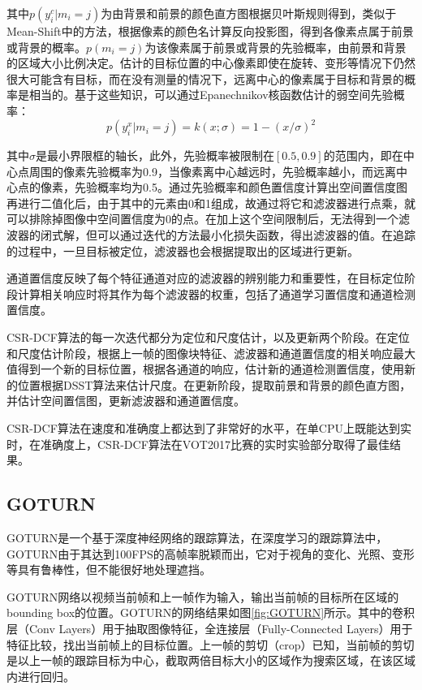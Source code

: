   其中$p(y_i^c | m_i=j)$为由背景和前景的颜色直方图根据贝叶斯规则得到，类似于Mean-Shift中的方法，根据像素的颜色名计算反向投影图，得到各像素点属于前景或背景的概率。$p(m_i=j)$为该像素属于前景或背景的先验概率，由前景和背景的区域大小比例决定。估计的目标位置的中心像素即使在旋转、变形等情况下仍然很大可能含有目标，而在没有测量的情况下，远离中心的像素属于目标和背景的概率是相当的。基于这些知识，可以通过Epanechnikov核函数估计的弱空间先验概率：
$$p(y_i^x | m_i=j) = k(x;\sigma)=1-(x/\sigma)^2$$

  其中$\sigma$是最小界限框的轴长，此外，先验概率被限制在$[0.5,0.9]$的范围内，即在中心点周围的像素先验概率为0.9，当像素离中心越远时，先验概率越小，而远离中心点的像素，先验概率均为0.5。通过先验概率和颜色置信度计算出空间置信度图再进行二值化后，由于其中的元素由0和1组成，故通过将它和滤波器进行点乘，就可以排除掉图像中空间置信度为0的点。在加上这个空间限制后，无法得到一个滤波器的闭式解，但可以通过迭代的方法最小化损失函数，得出滤波器的值。在追踪的过程中，一旦目标被定位，滤波器也会根据提取出的区域进行更新。

  通道置信度反映了每个特征通道对应的滤波器的辨别能力和重要性，在目标定位阶段计算相关响应时将其作为每个滤波器的权重，包括了通道学习置信度和通道检测置信度。

  CSR-DCF算法的每一次迭代都分为定位和尺度估计，以及更新两个阶段。在定位和尺度估计阶段，根据上一帧的图像块特征、滤波器和通道置信度的相关响应最大值得到一个新的目标位置，根据各通道的响应，估计新的通道检测置信度，使用新的位置根据DSST算法来估计尺度。在更新阶段，提取前景和背景的颜色直方图，并估计空间置信图，更新滤波器和通道置信度。

  CSR-DCF算法在速度和准确度上都达到了非常好的水平，在单CPU上既能达到实时，在准确度上，CSR-DCF算法在VOT2017比赛的实时实验部分取得了最佳结果\cite{kristan2017visual}。

\subsection{GOTURN}

  GOTURN是一个基于深度神经网络的跟踪算法\cite{held2016learning}，在深度学习的跟踪算法中，GOTURN由于其达到100FPS的高帧率脱颖而出，它对于视角的变化、光照、变形等具有鲁棒性，但不能很好地处理遮挡。

  GOTURN网络以视频当前帧和上一帧作为输入，输出当前帧的目标所在区域的bounding box的位置。GOTURN的网络结果如图\ref{fig:GOTURN}所示。其中的卷积层（Conv Layers）用于抽取图像特征，全连接层（Fully-Connected Layers）用于特征比较，找出当前帧上的目标位置。上一帧的剪切（crop）已知，当前帧的剪切是以上一帧的跟踪目标为中心，截取两倍目标大小的区域作为搜索区域，在该区域内进行回归。

